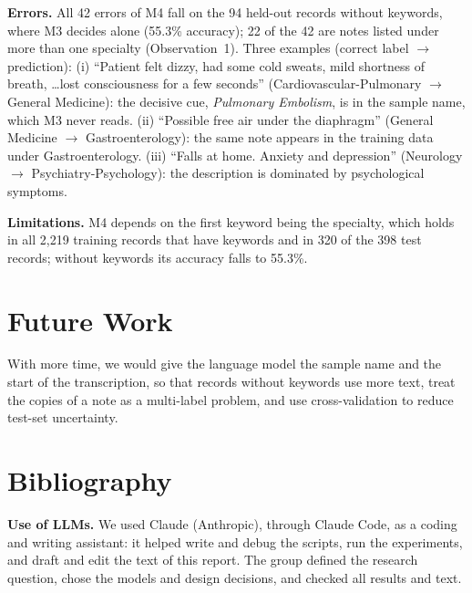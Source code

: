 \documentclass[twocolumn,10pt]{article}
\begin{document}
\textbf{Errors.} All 42 errors of M4 fall on the 94 held-out records without keywords, where M3 decides alone (55.3\% accuracy); 22 of the 42 are notes listed under more than one specialty (Observation~1). Three examples (correct label $\rightarrow$ prediction): (i) ``Patient felt dizzy, had some cold sweats, mild shortness of breath, \ldots lost consciousness for a few seconds'' (Cardiovascular-Pulmonary $\rightarrow$ General Medicine): the decisive cue, \emph{Pulmonary Embolism}, is in the sample name, which M3 never reads. (ii) ``Possible free air under the diaphragm'' (General Medicine $\rightarrow$ Gastroenterology): the same note appears in the training data under Gastroenterology. (iii) ``Falls at home. Anxiety and depression'' (Neurology $\rightarrow$ Psychiatry-Psychology): the description is dominated by psychological symptoms.

\textbf{Limitations.} M4 depends on the first keyword being the specialty, which holds in all 2{,}219 training records that have keywords and in 320 of the 398 test records; without keywords its accuracy falls to 55.3\%.

\section{Future Work}

With more time, we would give the language model the sample name and the start of the transcription, so that records without keywords use more text, treat the copies of a note as a multi-label problem, and use cross-validation to reduce test-set uncertainty.

\section*{Bibliography}

\textbf{Use of LLMs.} We used Claude (Anthropic), through Claude Code, as a coding and writing assistant: it helped write and debug the scripts, run the experiments, and draft and edit the text of this report. The group defined the research question, chose the models and design decisions, and checked all results and text.



\end{document}
